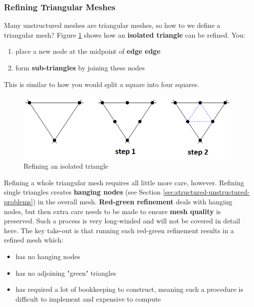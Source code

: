 \documentclass{article}
\begin{document}
\subsubsection{Refining Triangular Meshes}

Many unstructured meshes are triangular meshes, so how to we define a triangular mesh? Figure \ref{fig:isolated-triangle-refinement} shows how an \textbf{isolated triangle} can be refined. You:
\begin{enumerate}
	\item place a new node at the midpoint of \textbf{edge edge}
	\item form \textbf{sub-triangles} by joining these nodes
\end{enumerate}
This is similar to how you would split a square into four squares.

\begin{figure}
	\centering
	\includegraphics[scale=0.6]{figures/single-mesh-triangulation.png}
	\caption{Refining an isolated triangle}
	\label{fig:isolated-triangle-refinement}
\end{figure}

Refining a whole triangular mesh requires all little more care, however. Refining single triangles creates \textbf{hanging nodes} (see Section \ref{sec:structured-unstructured-problems}) in the overall mesh. \textbf{Red-green refinement} deals with hanging nodes, but then extra care needs to be made to ensure \textbf{mesh quality} is preserved. Such a process is very long-winded and will not be covered in detail here. The key take-out is that running such red-green refinement results in a refined mesh which:
\begin{itemize}
	\item has no hanging nodes
	\item has no adjoining "green" triangles
	\item has required a lot of bookkeeping to construct, meaning such a procedure is difficult to implement and expensive to compute
\end{itemize}
\end{document}
